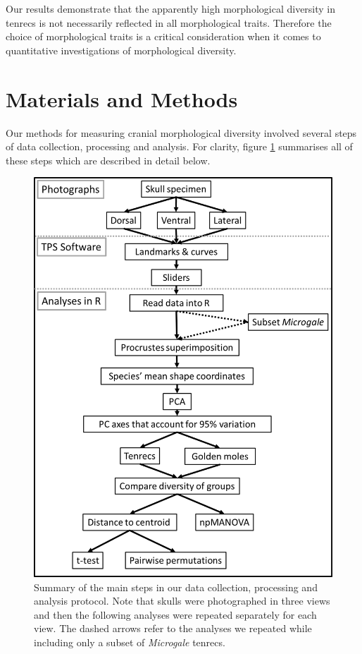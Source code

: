 \documentclass[12pt,a4paper]{article}
\begin{document}
	Our results demonstrate that the apparently high morphological diversity in tenrecs is not necessarily reflected in all morphological traits. Therefore the choice of morphological traits is a critical consideration when it comes to quantitative investigations of morphological diversity.
	

\section{Materials and Methods}

	Our methods for measuring cranial morphological diversity involved several steps of data collection, processing and analysis. For clarity,  figure \ref{fig:flow} summarises all of these steps which are described in detail below.   
	
		\begin{figure}
		\centering
		\includegraphics[width=1\linewidth]{figures/Methods_flowchart.png}
		
		\caption[Flowchart diagram of data collection and analysis]
			{Summary of the main steps in our data collection, processing and analysis protocol. Note that skulls were photographed in three views and then the following analyses were repeated separately for each view. The dashed arrows refer to the analyses we repeated while including only a subset of \textit{Microgale} tenrecs.}
		
		\label{fig:flow}
		\end{figure}
	
\end{document}
